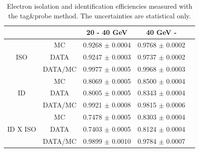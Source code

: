\begin{table}[h]
\begin{center}
\begin{tabular}{c|c|ccc}
\hline\hline
& & 20 - 40 GeV & 40 GeV -  \\
\hline
				& MC			& 	0.9268 $\pm$ 0.0004 & 	0.9768 $\pm$ 0.0002 \\
ISO				& DATA			& 	0.9247 $\pm$ 0.0003 & 	0.9737 $\pm$ 0.0002 \\
				& DATA/MC		& 	0.9977 $\pm$ 0.0005 & 	0.9968 $\pm$ 0.0003 \\
\hline
				& MC			& 	0.8069 $\pm$ 0.0005 & 	0.8500 $\pm$ 0.0004 \\
ID				& DATA			& 	0.8005 $\pm$ 0.0005 & 	0.8343 $\pm$ 0.0004 \\
				& DATA/MC		& 	0.9921 $\pm$ 0.0008 & 	0.9815 $\pm$ 0.0006 \\
\hline
				& MC			& 	0.7478 $\pm$ 0.0005 & 	0.8303 $\pm$ 0.0004 \\
ID X ISO			& DATA			& 	0.7403 $\pm$ 0.0005 & 	0.8124 $\pm$ 0.0004 \\
				& DATA/MC		& 	0.9899 $\pm$ 0.0010 & 	0.9784 $\pm$ 0.0007 \\
\hline \hline
\hline
\end{tabular}
\caption{\label{tab:eleEffs}Electron isolation and identification efficiencies measured with the tag\&probe method.
The uncertainties are statistical only.}
\end{center}
\end{table}


